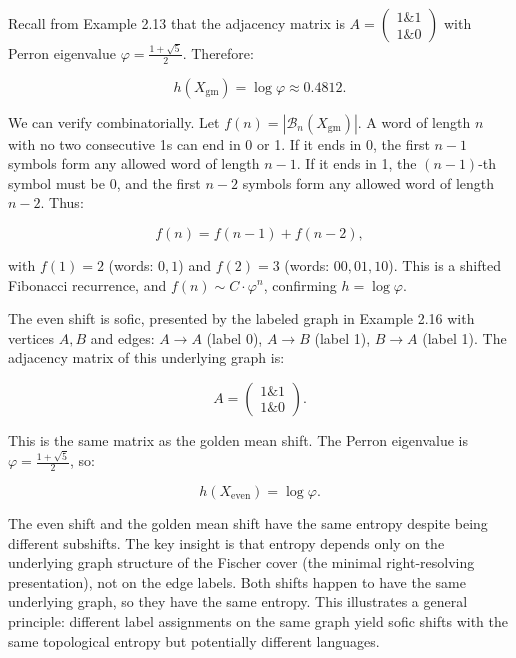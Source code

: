 \begin{example}
Recall from Example 2.13 that the adjacency matrix is $A = \begin{pmatrix} 1 \& 1 \\ 1 \& 0 \end{pmatrix}$ with Perron eigenvalue $\varphi = \frac{1+\sqrt{5}}{2}$. Therefore:

\[h(X_{\text{gm}}) = \log \varphi \approx 0.4812.\]

We can verify combinatorially. Let $f(n) = |\mathcal{B}_n(X_{\text{gm}})|$. A word of length $n$ with no two consecutive 1s can end in 0 or 1. If it ends in 0, the first $n-1$ symbols form any allowed word of length $n-1$. If it ends in 1, the $(n-1)$-th symbol must be 0, and the first $n-2$ symbols form any allowed word of length $n-2$. Thus:

\[f(n) = f(n-1) + f(n-2),\]

with $f(1) = 2$ (words: $0, 1$) and $f(2) = 3$ (words: $00, 01, 10$). This is a shifted Fibonacci recurrence, and $f(n) \sim C \cdot \varphi^n$, confirming $h = \log \varphi$.
\end{example}

\begin{example}
The even shift is sofic, presented by the labeled graph in Example 2.16 with vertices $A, B$ and edges: $A \to A$ (label 0), $A \to B$ (label 1), $B \to A$ (label 1). The adjacency matrix of this underlying graph is:

\[A = \begin{pmatrix} 1 \& 1 \\ 1 \& 0 \end{pmatrix}.\]

This is the same matrix as the golden mean shift. The Perron eigenvalue is $\varphi = \frac{1+\sqrt{5}}{2}$, so:

\[h(X_{\text{even}}) = \log \varphi.\]

The even shift and the golden mean shift have the same entropy despite being different subshifts. The key insight is that entropy depends only on the underlying graph structure of the Fischer cover (the minimal right-resolving presentation), not on the edge labels. Both shifts happen to have the same underlying graph, so they have the same entropy. This illustrates a general principle: different label assignments on the same graph yield sofic shifts with the same topological entropy but potentially different languages.
\end{example}



